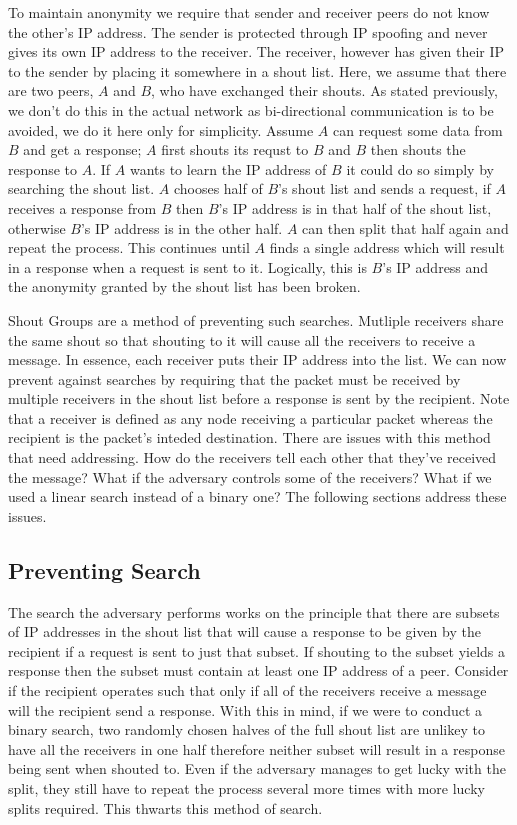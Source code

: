 \documentclass[ %
                    author={Luke Murray},
                supervisor={Dr. Simon Hollis},
                     title={Shadow Peer-to-Peer Networks},
                  subtitle={},
                    degree={MEng},
                      year={2013} ]{thesis}
\begin{document}
To maintain anonymity we require that sender and receiver peers do not know the other's IP address. The sender is protected through IP spoofing and never gives its own IP address to the receiver. The receiver, however has given their IP to the sender by placing it somewhere in a shout list. Here, we assume that there are two peers, $A$ and $B$, who have exchanged their shouts. As stated previously, we don't do this in the actual network as bi-directional communication is to be avoided, we do it here only for simplicity. Assume $A$ can request some data from $B$ and get a response; $A$ first shouts its requst to $B$ and $B$ then shouts the response to $A$. If $A$ wants to learn the IP address of $B$ it could do so simply by searching the shout list. $A$ chooses half of $B$'s shout list and sends a request, if $A$ receives a response from $B$ then $B$'s IP address is in that half of the shout list, otherwise $B$'s IP address is in the other half. $A$ can then split that half again and repeat the process. This continues until $A$ finds a single address which will result in a response when a request is sent to it. Logically, this is $B$'s IP address and the anonymity granted by the shout list has been broken.

Shout Groups are a method of preventing such searches. Mutliple receivers share the same shout so that shouting to it will cause all the receivers to receive a message. In essence, each receiver puts their IP address into the list. We can now prevent against searches by requiring that the packet must be received by multiple receivers in the shout list before a response is sent by the recipient. Note that a receiver is defined as any node receiving a particular packet whereas the recipient is the packet's inteded destination. There are issues with this method that need addressing. How do the receivers tell each other that they've received the message? What if the adversary controls some of the receivers? What if we used a linear search instead of a binary one? The following sections address these issues.

\subsection{Preventing Search}

The search the adversary performs works on the principle that there are subsets of IP addresses in the shout list that will cause a response to be given by the recipient if a request is sent to just that subset. If shouting to the subset yields a response then the subset must contain at least one IP address of a peer. Consider if the recipient operates such that only if all of the receivers receive a message will the recipient send a response. With this in mind, if we were to conduct a binary search, two randomly chosen halves of the full shout list are unlikey to have all the receivers in one half therefore neither subset will result in a response being sent when shouted to. Even if the adversary manages to get lucky with the split, they still have to repeat the process several more times with more lucky splits required. This thwarts this method of search.
\end{document}

